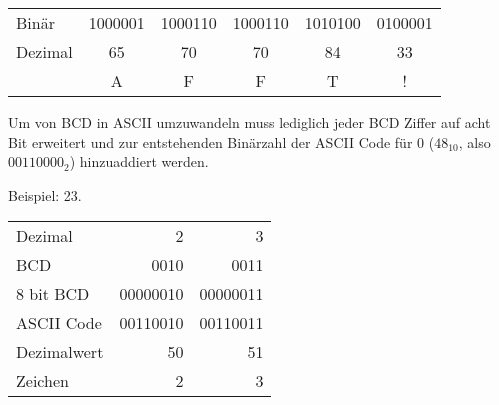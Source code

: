 \documentclass{CInf_practice}
\begin{document}
\begin{center}
  \begin{tabular}{B|CCCCC}
    Binär   & 1000001 & 1000110 & 1000110 & 1010100 & 0100001 \\
    Dezimal &      65 &      70 &      70 &      84 &      33 \\ \hline
            &       A &       F &       F &       T &       !
  \end{tabular}
\end{center}



Um von BCD in ASCII umzuwandeln muss lediglich jeder BCD Ziffer auf acht Bit erweitert und zur entstehenden Binärzahl der ASCII Code für 0 ($48_{10}$, also $00110000_2$) hinzuaddiert werden.

Beispiel: 23.

\begin{center}
  \begin{tabular}{B|RR}
    Dezimal & 2 & 3 \\
    BCD     & 0010 & 0011 \\
    8 bit BCD & 00000010 & 00000011 \\
    ASCII Code & 00110010 & 00110011 \\
    Dezimalwert & 50 & 51 \\
    Zeichen & 2 & 3
  \end{tabular}
\end{center}
\end{document}
